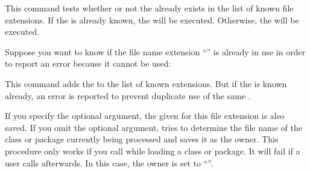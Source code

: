 \begin{Declaration}
\end{Declaration}
This command tests whether or not the  already exists in the
list of known file extensions. If the  is already known, the
 will be executed. Otherwise, the  will be
executed.
\begin{Example}
  Suppose you want to know if the file name extension ``'' is
  already in use in order to report an error because it cannot be used:
\begin{lstcode}
\end{lstcode}
\end{Example}
\EndIndexGroup


\begin{Declaration}
\end{Declaration}
This command adds the  to the list of known extensions. But
if the  is known already, an error is reported to prevent
duplicate use of the same .

If you specify the optional  argument, the given
 for this file extension is also saved. If you omit the optional
argument,  tries to determine the file name of the class or
package currently being processed and saves it as the owner.
This procedure only works if you call
 while loading a class or package. It will fail if a user
calls  afterwards. In this case, the owner is set to
``''.


